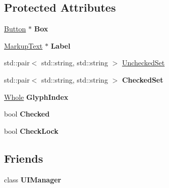 \subsection*{Protected Attributes}
\begin{DoxyCompactItemize}
\item 
\hypertarget{classphys_1_1UI_1_1CheckBox_a1118ba10131845d77085bc1b9e41fdab}{
\hyperlink{classphys_1_1UI_1_1Button}{Button} $\ast$ {\bfseries Box}}
\label{dd/d10/classphys_1_1UI_1_1CheckBox_a1118ba10131845d77085bc1b9e41fdab}

\item 
\hypertarget{classphys_1_1UI_1_1CheckBox_a99640351f23baac8e36ef3d64140e404}{
\hyperlink{classphys_1_1UI_1_1MarkupText}{MarkupText} $\ast$ {\bfseries Label}}
\label{dd/d10/classphys_1_1UI_1_1CheckBox_a99640351f23baac8e36ef3d64140e404}

\item 
std::pair$<$ std::string, std::string $>$ \hyperlink{classphys_1_1UI_1_1CheckBox_a7b670d93f119193283ec78b94f842429}{UncheckedSet}
\item 
\hypertarget{classphys_1_1UI_1_1CheckBox_ae4bb7dad2474b7f74ebe1320fef7a58e}{
std::pair$<$ std::string, std::string $>$ {\bfseries CheckedSet}}
\label{dd/d10/classphys_1_1UI_1_1CheckBox_ae4bb7dad2474b7f74ebe1320fef7a58e}

\item 
\hypertarget{classphys_1_1UI_1_1CheckBox_afc37b1eaaf6ab441a71569757802571b}{
\hyperlink{namespacephys_a460f6bc24c8dd347b05e0366ae34f34a}{Whole} {\bfseries GlyphIndex}}
\label{dd/d10/classphys_1_1UI_1_1CheckBox_afc37b1eaaf6ab441a71569757802571b}

\item 
\hypertarget{classphys_1_1UI_1_1CheckBox_af539bce89119b8e21fa19f170cc5d7e5}{
bool {\bfseries Checked}}
\label{dd/d10/classphys_1_1UI_1_1CheckBox_af539bce89119b8e21fa19f170cc5d7e5}

\item 
\hypertarget{classphys_1_1UI_1_1CheckBox_ae8f71565ce43129a44930131850d6e16}{
bool {\bfseries CheckLock}}
\label{dd/d10/classphys_1_1UI_1_1CheckBox_ae8f71565ce43129a44930131850d6e16}

\end{DoxyCompactItemize}
\subsection*{Friends}
\begin{DoxyCompactItemize}
\item 
\hypertarget{classphys_1_1UI_1_1CheckBox_ab811b36cd63b54fe42b6acb231ea21bc}{
class {\bfseries UIManager}}
\label{dd/d10/classphys_1_1UI_1_1CheckBox_ab811b36cd63b54fe42b6acb231ea21bc}

\end{DoxyCompactItemize}


